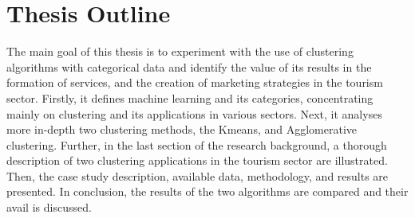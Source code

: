 \section{Thesis Outline}
The main goal of this thesis is to experiment with the use of clustering algorithms with categorical data and identify the value of its results in the formation of services, and the creation of marketing strategies in the tourism sector. Firstly, it defines machine learning and its categories, concentrating mainly on clustering and its applications in various sectors. Next, it analyses more in-depth two clustering methods, the Kmeans, and Agglomerative clustering. Further, in the last section of the research background, a thorough description of two clustering applications in the tourism sector are illustrated. Then, the case study description, available data, methodology, and results are presented. In conclusion, the results of the two algorithms are compared and their avail is discussed.